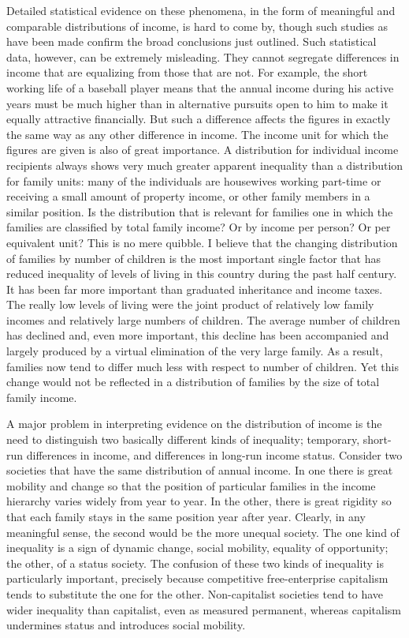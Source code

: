 \documentclass[11pt,openany]{book}
\begin{document}
Detailed statistical evidence on these phenomena, in the form of meaningful and comparable distributions of income, is hard to come by, though such studies as have been made confirm the broad conclusions just outlined. Such statistical data, however, can be extremely misleading. They cannot segregate differences in income that are equalizing from those that are not. For example, the short working life of a baseball player means that the annual income during his active years must be much higher than in alternative pursuits open to him to make it equally attractive financially. But such a difference affects the figures in exactly the same way as any other difference in income. The income unit for which the figures are given is also of great importance. A distribution for individual income recipients always shows very much greater apparent inequality than a distribution for family units: many of the individuals are housewives working part-time or receiving a small amount of property income, or other family members in a similar position. Is the distribution that is relevant for families one in which the families are classified by total family income? Or by income per person? Or per equivalent unit? This is no mere quibble. I believe that the changing distribution of families by number of children is the most important single factor that has reduced inequality of levels of living in this country during the past half century. It has been far more important than graduated inheritance and income taxes. The really low levels of living were the joint product of relatively low family incomes and relatively large numbers of children. The average number of children has declined and, even more important, this decline has been accompanied and largely produced by a virtual elimination of the very large family. As a result, families now tend to differ much less with respect to number of children. Yet this change would not be reflected in a distribution of families by the size of total family income.

A major problem in interpreting evidence on the distribution of income is the need to distinguish two basically different kinds of inequality; temporary, short-run differences in income, and differences in long-run income status. Consider two societies that have the same distribution of annual income. In one there is great mobility and change so that the position of particular families in the income hierarchy varies widely from year to year. In the other, there is great rigidity so that each family stays in the same position year after year. Clearly, in any meaningful sense, the second would be the more unequal society. The one kind of inequality is a sign of dynamic change, social mobility, equality of opportunity; the other, of a status society. The confusion of these two kinds of inequality is particularly important, precisely because competitive free-enterprise capitalism tends to substitute the one for the other. Non-capitalist societies tend to have wider inequality than capitalist, even as measured permanent, whereas capitalism undermines status and introduces social mobility.
\end{document}
